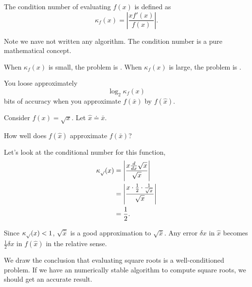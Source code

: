 \begin{definition}
    The condition number of evaluating \( f(x) \) is defined as \[
        \kappa_f(x) = \left| \frac{x f'(x)}{f(x)} \right|.
    \]
\end{definition}

\begin{remark}
    Note we nave not written any algorithm. The condition number is a pure mathematical concept.
\end{remark}

\begin{remark}
    When \( \kappa_f(x) \) is small, the problem is . When \( \kappa_f(x) \) is large, the problem is .
\end{remark}

\begin{remark}
    You loose approximately \[
        \log_2 \kappa_f(x)
    \] bits of accuracy when you approximate \( f(\bar{x}) \) by \( f(\hat{x}) \).
\end{remark}

\begin{example}
    Consider \( f(x) = \sqrt{x} \). Let \( \hat{x} \doteq \bar{{x}} \).

    How well does \( f(\hat{x}) \) approximate \( f(\bar{x}) \)?

    Let's look at the conditional number for this function, \begin{align*}
        \kappa_{\sqrt{\null}}(x)
         & = \left| \frac{x \frac{d}{dx} \sqrt{x}}{\sqrt{x}} \right|                      \\
         & = \left| \frac{x \cdot \frac{1}{2} \cdot \frac{1}{\sqrt{x}}}{\sqrt{x}} \right| \\
         & = \frac{1}{2}.
    \end{align*}

    Since \( \kappa_{\sqrt{\null}}(x) < 1 \), \( \sqrt{\hat{x}} \) is a good approximation to \( \sqrt{\bar{x}} \). Any error \( \delta x \) in \( \hat{x} \) becomes \( \frac{1}{2} \delta x \) in \( f(\hat{x}) \) in the relative sense.

    We draw the conclusion that evaluating square roots is a well-conditioned problem. If we have an numerically stable algorithm to compute square roots, we should get an accurate result.
\end{example}

